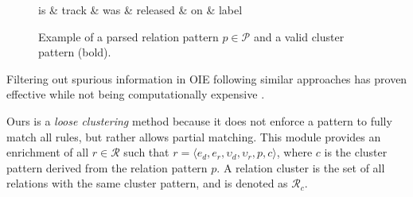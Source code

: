 \begin{figure}[!htb]
\centering
\begin{dependency}
\begin{deptext}[column sep=.5cm]
is \& track \& was \& released \& on \& label \\
\end{deptext}




\end{dependency}
\vspace*{-5mm}
\caption{Example of a parsed relation pattern $p \in \mathcal{P}$ and a valid cluster pattern (bold).}
\label{fig:kb:parsedpattern}
\end{figure}


Filtering out spurious information in OIE following similar approaches has proven effective while not being computationally expensive \cite{Fader2011}.

Ours is a \textit{loose clustering} method because it does not enforce a pattern to fully match all rules, but rather allows partial matching. This module provides an enrichment of all $r \in \mathcal{R}$ such that $r = \langle e_d, e_r, \upsilon_d, \upsilon_r, p, c\rangle$, where $c$ is the cluster pattern derived from the relation pattern $p$. A relation cluster is the set of all relations with the same cluster pattern, and is denoted as $\mathcal{R}_c$. 


